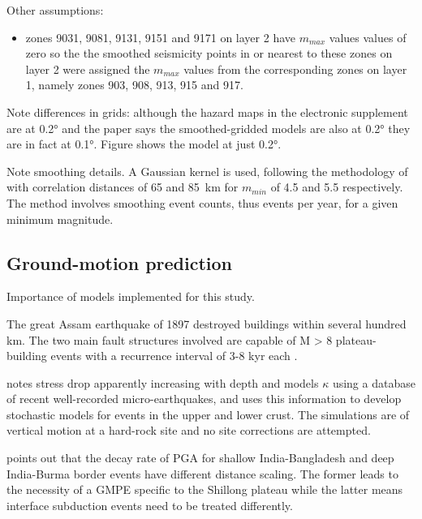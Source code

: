 \documentclass{article}
\begin{document}
Other assumptions:
\begin{itemize}
\item zones 9031, 9081, 9131, 9151 and 9171 on layer 2 have $m_{max}$ values values of zero so the the smoothed seismicity points in or nearest to these zones on layer 2 were assigned the $m_{max}$ values from the corresponding zones on layer 1, namely zones 903, 908, 913, 915 and 917.
\end{itemize}

Note differences in grids: although the hazard maps in the electronic supplement are at 0.2° and the paper says the smoothed-gridded models are also at 0.2° they are in fact at 0.1°. Figure shows the model at just 0.2°.

Note smoothing details. A Gaussian kernel is used, following the methodology of \cite{frankel1995mapping} with correlation distances of 65 and 85~km for $m_{min}$ of 4.5 and 5.5 respectively. The method involves smoothing event counts, thus events per year, for a given minimum magnitude.

\cite{thingbaijam2011synoptic}

\cite{nath2010earthquake}

\subsection{Ground-motion prediction}
\label{subsec:GroundMotion}

Importance of models implemented for this study. 

The great Assam earthquake of 1897 destroyed buildings within several hundred km. The two main fault structures involved are capable of M > 8 plateau-building events with a recurrence interval of 3-8 kyr each \citep{bilham2001plateau}.

\cite{nath2012ground} notes stress drop apparently increasing with depth and models $\kappa$ using a database of recent well-recorded micro-earthquakes, and uses this information to develop stochastic models for events in the upper and lower crust. The simulations are of vertical motion at a hard-rock site and no site corrections are attempted.

\cite{sharma2009ground} points out that the decay rate of PGA for shallow India-Bangladesh and deep India-Burma border events have different distance scaling. The former leads to the necessity of a GMPE specific to the Shillong plateau \cite{nath2012ground} while the latter means interface subduction events need to be treated differently. 
\end{document}
